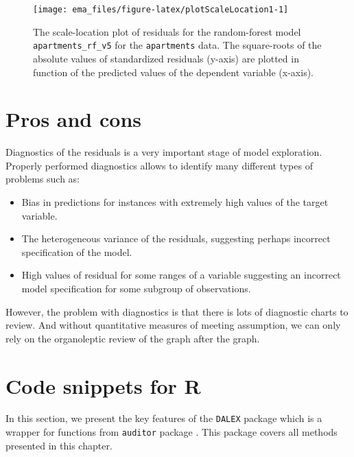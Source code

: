 \documentclass[]{krantz}
\providecommand{\tightlist}{%
  \setlength{\itemsep}{0pt}\setlength{\parskip}{0pt}}
\begin{document}
\begin{figure}

{\centering \texttt{[image: ema\_files/figure-latex/plotScaleLocation1-1]} 

}

\caption{The scale-location plot of residuals for the random-forest model \texttt{apartments\_rf\_v5} for the \texttt{apartments} data. The square-roots of the absolute values of standardized residuals (y-axis) are plotted in function of the predicted values of the dependent variable (x-axis).}\label{fig:plotScaleLocation1}
\end{figure}

\hypertarget{ProsConsResidualDiagnostic}{%
\section{Pros and cons}\label{ProsConsResidualDiagnostic}}

Diagnostics of the residuals is a very important stage of model exploration.
Properly performed diagnostics allows to identify many different types of problems such as:

\begin{itemize}
\tightlist
\item
  Bias in predictions for instances with extremely high values of the target variable.
\item
  The heterogeneous variance of the residuals, suggesting perhaps incorrect specification of the model.
\item
  High values of residual for some ranges of a variable suggesting an incorrect model specification for some subgroup of observations.
\end{itemize}

However, the problem with diagnostics is that there is lots of diagnostic charts to review. And without quantitative measures of meeting assumption, we can only rely on the organoleptic review of the graph after the graph.

\hypertarget{RcodeResidualDiagnostic}{%
\section{Code snippets for R}\label{RcodeResidualDiagnostic}}

In this section, we present the key features of the \texttt{DALEX} package which is a wrapper for functions from \texttt{auditor} package \citep{R-auditor}. This package covers all methods presented in this chapter.
\end{document}
